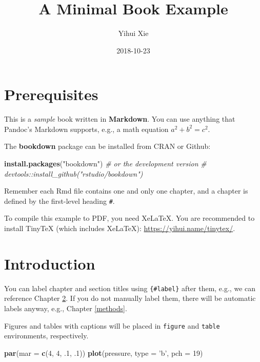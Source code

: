 \documentclass[]{book}
\title{A Minimal Book Example}
\author{Yihui Xie}
\date{2018-10-23}
\newenvironment{Shaded}{\begin{snugshade}}{\end{snugshade}}
\newcommand{\KeywordTok}[1]{\textcolor[rgb]{0.13,0.29,0.53}{\textbf{#1}}}
\newcommand{\DataTypeTok}[1]{\textcolor[rgb]{0.13,0.29,0.53}{#1}}
\newcommand{\DecValTok}[1]{\textcolor[rgb]{0.00,0.00,0.81}{#1}}
\newcommand{\StringTok}[1]{\textcolor[rgb]{0.31,0.60,0.02}{#1}}
\newcommand{\CommentTok}[1]{\textcolor[rgb]{0.56,0.35,0.01}{\textit{#1}}}
\newcommand{\NormalTok}[1]{#1}
\begin{document}
\maketitle

{
\setcounter{tocdepth}{1}
\tableofcontents
}
\chapter{Prerequisites}\label{prerequisites}

This is a \emph{sample} book written in \textbf{Markdown}. You can use
anything that Pandoc's Markdown supports, e.g., a math equation
\(a^2 + b^2 = c^2\).

The \textbf{bookdown} package can be installed from CRAN or Github:

\begin{Shaded}
\begin{Highlighting}[]
\KeywordTok{install.packages}\NormalTok{(}\StringTok{"bookdown"}\NormalTok{)}
\CommentTok{# or the development version}
\CommentTok{# devtools::install_github("rstudio/bookdown")}
\end{Highlighting}
\end{Shaded}

Remember each Rmd file contains one and only one chapter, and a chapter
is defined by the first-level heading \texttt{\#}.

To compile this example to PDF, you need XeLaTeX. You are recommended to
install TinyTeX (which includes XeLaTeX):
\url{https://yihui.name/tinytex/}.

\chapter{Introduction}\label{intro}

You can label chapter and section titles using \texttt{\{\#label\}}
after them, e.g., we can reference Chapter \ref{intro}. If you do not
manually label them, there will be automatic labels anyway, e.g.,
Chapter \ref{methods}.

Figures and tables with captions will be placed in \texttt{figure} and
\texttt{table} environments, respectively.

\begin{Shaded}
\begin{Highlighting}[]
\KeywordTok{par}\NormalTok{(}\DataTypeTok{mar =} \KeywordTok{c}\NormalTok{(}\DecValTok{4}\NormalTok{, }\DecValTok{4}\NormalTok{, .}\DecValTok{1}\NormalTok{, .}\DecValTok{1}\NormalTok{))}
\KeywordTok{plot}\NormalTok{(pressure, }\DataTypeTok{type =} \StringTok{'b'}\NormalTok{, }\DataTypeTok{pch =} \DecValTok{19}\NormalTok{)}
\end{Highlighting}
\end{Shaded}
\end{document}
